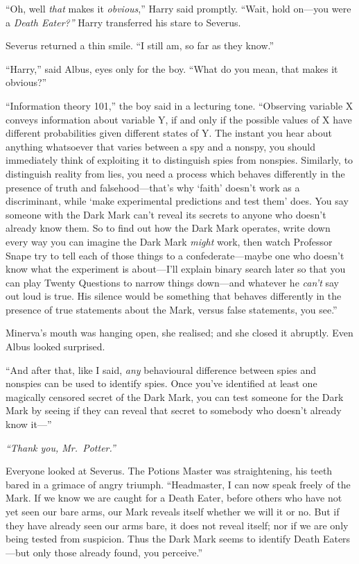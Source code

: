 ``Oh, well \emph{that} makes it \emph{obvious},'' Harry said promptly.
``Wait, hold on---you were a \emph{Death Eater?''} Harry transferred his
stare to Severus.

Severus returned a thin smile. ``I still am, so far as they know.''

``Harry,'' said Albus, eyes only for the boy. ``What do you mean, that
makes it obvious?''

``Information theory 101,'' the boy said in a lecturing tone.
``Observing variable X conveys information about variable Y, if and only
if the possible values of X have different probabilities given different
states of Y. The instant you hear about anything whatsoever that varies
between a spy and a nonspy, you should immediately think of exploiting
it to distinguish spies from nonspies. Similarly, to distinguish reality
from lies, you need a process which behaves differently in the presence
of truth and falsehood---that's why `faith' doesn't work as a
discriminant, while `make experimental predictions and test them' does.
You say someone with the Dark Mark can't reveal its secrets to anyone
who doesn't already know them. So to find out how the Dark Mark
operates, write down every way you can imagine the Dark Mark
\emph{might} work, then watch Professor Snape try to tell each of those
things to a confederate---maybe one who doesn't know what the experiment
is about---I'll explain binary search later so that you can play Twenty
Questions to narrow things down---and whatever he \emph{can't} say out
loud is true. His silence would be something that behaves differently in
the presence of true statements about the Mark, versus false statements,
you see.''

Minerva's mouth was hanging open, she realised; and she closed it
abruptly. Even Albus looked surprised.

``And after that, like I said, \emph{any} behavioural difference between
spies and nonspies can be used to identify spies. Once you've identified
at least one magically censored secret of the Dark Mark, you can test
someone for the Dark Mark by seeing if they can reveal that secret to
somebody who doesn't already know it---''

\emph{``Thank you, Mr.~Potter.''}

Everyone looked at Severus. The Potions Master was straightening, his
teeth bared in a grimace of angry triumph. ``Headmaster, I can now speak
freely of the Mark. If we know we are caught for a Death Eater, before
others who have not yet seen our bare arms, our Mark reveals itself
whether we will it or no. But if they have already seen our arms bare,
it does not reveal itself; nor if we are only being tested from
suspicion. Thus the Dark Mark seems to identify Death Eaters---but only
those already found, you perceive.''

